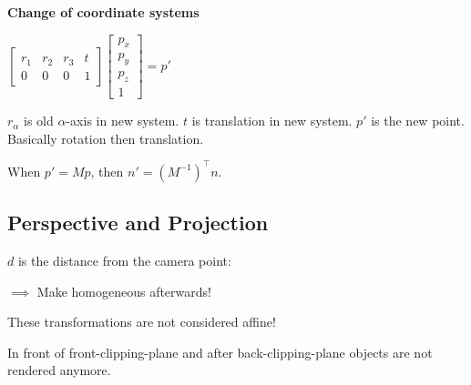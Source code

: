 \textbf{Change of coordinate systems}
\vspace{-10pt}
\begin{multicols}{2}
  \(\begin{bmatrix}
    r_1 & r_2 & r_3 & t \\
    0 & 0 & 0 & 1
  \end{bmatrix} \begin{bmatrix}
    p_x \\ p_y \\ p_z \\ 1
  \end{bmatrix} = p'\)

  \(r_\alpha\) is old \(\alpha\)-axis in new system.
  \(t\) is translation in new system.
  \(p'\) is the new point.
  Basically rotation then translation.
\end{multicols}

\vspace{-10pt}
\begin{definition}
  When \(p' = Mp\), then \(n' = (M^{-1})^\top n\).
\end{definition}

\subsection{Perspective and Projection}
\(d\) is the distance from the camera point:


\(\implies\) Make homogeneous afterwards!

\begin{theorem}
  These transformations are not considered affine!
\end{theorem}

\begin{definition}
  In front of front-clipping-plane and after back-clipping-plane objects are not rendered anymore.
\end{definition}

